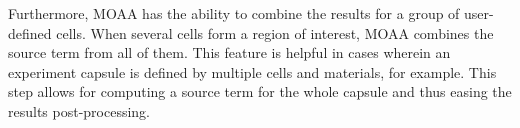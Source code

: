 Furthermore, MOAA has the ability to combine the results for a group of user-defined cells.
When several cells form a region of interest, MOAA combines the source term from all of them.
This feature is helpful in cases wherein an experiment capsule is defined by multiple cells and materials, for example.
This step allows for computing a source term for the whole capsule and thus easing the results post-processing.




